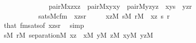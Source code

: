\begin{isabellebody}
\ \ \ \ \ \ \ \ \ \ \ \ \ \ pair{\isacharparenleft}{\kern0pt}{\isacharhash}{\kern0pt}{\isacharhash}{\kern0pt}M{\isacharcomma}{\kern0pt}x{\isacharcomma}{\kern0pt}z{\isacharcomma}{\kern0pt}xz{\isacharparenright}{\kern0pt}\ {\isacharampersand}{\kern0pt}\ pair{\isacharparenleft}{\kern0pt}{\isacharhash}{\kern0pt}{\isacharhash}{\kern0pt}M{\isacharcomma}{\kern0pt}x{\isacharcomma}{\kern0pt}y{\isacharcomma}{\kern0pt}xy{\isacharparenright}{\kern0pt}\ {\isacharampersand}{\kern0pt}\ pair{\isacharparenleft}{\kern0pt}{\isacharhash}{\kern0pt}{\isacharhash}{\kern0pt}M{\isacharcomma}{\kern0pt}y{\isacharcomma}{\kern0pt}z{\isacharcomma}{\kern0pt}yz{\isacharparenright}{\kern0pt}\ {\isacharampersand}{\kern0pt}\ xy{\isasymin}s\ {\isacharampersand}{\kern0pt}\ yz{\isasymin}r{\isacharparenright}{\kern0pt}\isanewline
\ \ \ \ \ \ \ \ \ \ {\isasymlongleftrightarrow}\ sats{\isacharparenleft}{\kern0pt}M{\isacharcomma}{\kern0pt}cfm{\isacharparenleft}{\kern0pt}{}{\isacharcomma}{\kern0pt}{}{\isacharcomma}{\kern0pt}{}{\isacharparenright}{\kern0pt}\ {\isacharcomma}{\kern0pt}\ {\isacharbrackleft}{\kern0pt}xz{\isacharcomma}{\kern0pt}s{\isacharcomma}{\kern0pt}r{\isacharbrackright}{\kern0pt}{\isacharparenright}{\kern0pt}{\isachardoublequoteclose}\isanewline
\ \ \ \ \ {\isachardoublequoteopen}xz{\isasymin}M{\isachardoublequoteclose}\ {\isachardoublequoteopen}s{\isasymin}M{\isachardoublequoteclose}\ {\isachardoublequoteopen}r{\isasymin}M{\isachardoublequoteclose}\ \ xz\ s\ r\isanewline
\ \ \ \ \isamarkupfalse%
\ that\ fmsats{\isacharbrackleft}{\kern0pt}of\ {\isachardoublequoteopen}{\isacharbrackleft}{\kern0pt}xz{\isacharcomma}{\kern0pt}s{\isacharcomma}{\kern0pt}r{\isacharbrackright}{\kern0pt}{\isachardoublequoteclose}{\isacharbrackright}{\kern0pt}\ \isamarkupfalse%
\ simp\isanewline
\ \ \isamarkupfalse%
\isanewline
\ \ \isamarkupfalse%
\ {\isachardoublequoteopen}{\isasymforall}s{\isasymin}M{\isachardot}{\kern0pt}\ {\isasymforall}r{\isasymin}M{\isachardot}{\kern0pt}\ separation{\isacharparenleft}{\kern0pt}{\isacharhash}{\kern0pt}{\isacharhash}{\kern0pt}M{\isacharcomma}{\kern0pt}\ {\isasymlambda}xz\ {\isachardot}{\kern0pt}\ {\isasymexists}x{\isasymin}M{\isachardot}{\kern0pt}\ {\isasymexists}y{\isasymin}M{\isachardot}{\kern0pt}\ {\isasymexists}z{\isasymin}M{\isachardot}{\kern0pt}\ {\isasymexists}xy{\isasymin}M{\isachardot}{\kern0pt}\ {\isasymexists}yz{\isasymin}M{\isachardot}{\kern0pt}\isanewline

\end{isabellebody}
